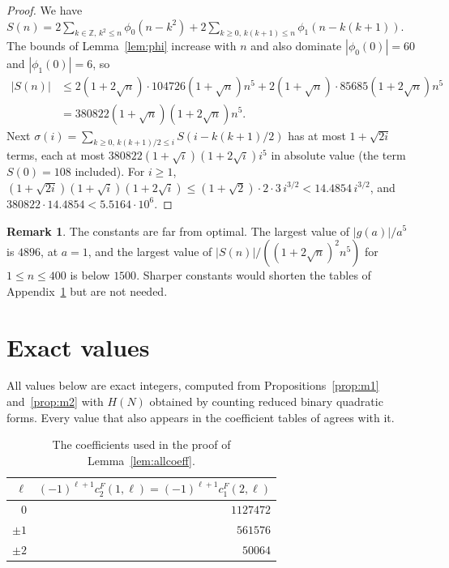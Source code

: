\documentclass[11pt]{amsart}
\theoremstyle{definition}
\newtheorem{remark}[theorem]{Remark}
\newcommand{\ZZ}{\mathbb{Z}}
\begin{document}
\begin{proof}
We have $S(n)=2\sum_{k\in\ZZ,\,k^2\le n}\phi_0(n-k^2)+2\sum_{k\ge0,\,k(k+1)\le n}\phi_1(n-k(k+1))$. The bounds of Lemma~\ref{lem:phi} increase with $n$ and also dominate $|\phi_0(0)|=60$ and $|\phi_1(0)|=6$, so
\begin{align*}
|S(n)|&\le2(1+2\sqrt n)\cdot104726(1+\sqrt n)n^5+2(1+\sqrt n)\cdot85685(1+2\sqrt n)n^5\\
&=380822(1+\sqrt n)(1+2\sqrt n)n^5.
\end{align*}
Next $\sigma(i)=\sum_{k\ge0,\,k(k+1)/2\le i}S(i-k(k+1)/2)$ has at most $1+\sqrt{2i}$ terms, each at most $380822(1+\sqrt i)(1+2\sqrt i)i^5$ in absolute value (the term $S(0)=108$ included). For $i\ge1$, $(1+\sqrt{2i})(1+\sqrt i)(1+2\sqrt i)\le(1+\sqrt2)\cdot2\cdot3\,i^{3/2}<14.4854\,i^{3/2}$, and $380822\cdot14.4854<5.5164\cdot10^6$.
\end{proof}

\begin{remark}
The constants are far from optimal. The largest value of $|g(a)|/a^5$ is $4896$, at $a=1$, and the largest value of $|S(n)|/((1+2\sqrt n)^2n^5)$ for $1\le n\le400$ is below $1500$. Sharper constants would shorten the tables of Appendix~\ref{app:tables} but are not needed.
\end{remark}

\section{Exact values}\label{app:tables}

All values below are exact integers, computed from Propositions~\ref{prop:m1} and~\ref{prop:m2} with $H(N)$ obtained by counting reduced binary quadratic forms. Every value that also appears in the coefficient tables of \cite[Appendix~A]{BM13} agrees with it.

\begin{table}[H]
\centering
\small
\begin{tabular}{rr}
\toprule
$\ell$ & $(-1)^{\ell+1}c^F_2(1,\ell)=(-1)^{\ell+1}c^F_1(2,\ell)$\\
\midrule
$0$ & $1127472$\\
$\pm1$ & $561576$\\
$\pm2$ & $50064$\\
\bottomrule
\end{tabular}
\caption{The coefficients used in the proof of Lemma~\ref{lem:allcoeff}.}
\label{tab:prim}
\end{table}
\end{document}
